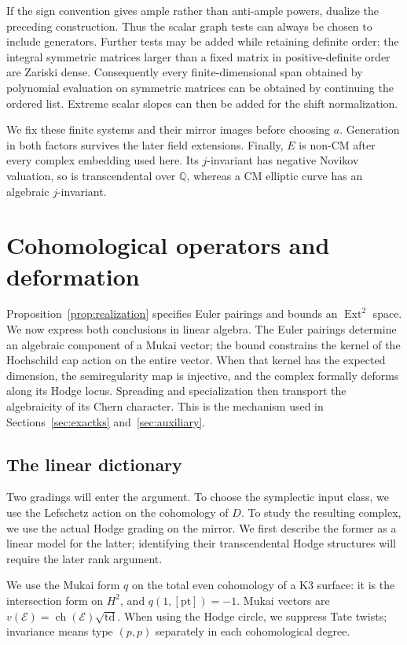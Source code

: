 \documentclass[11pt]{article}
\numberwithin{equation}{section}
\theoremstyle{definition}
\theoremstyle{remark}
\begin{document}
If the sign convention gives ample rather than anti-ample powers,
dualize the preceding construction.  Thus the scalar graph tests can
always be chosen to include generators.  Further tests may be added
while retaining definite order: the integral symmetric matrices larger
than a fixed matrix in positive-definite order are Zariski dense.
Consequently every finite-dimensional span obtained by polynomial
evaluation on symmetric matrices can be obtained by continuing the
ordered list.  Extreme scalar slopes can then be added for the shift
normalization.

We fix these finite systems and their mirror images before choosing
$a$.  Generation in both factors survives the later field extensions.
Finally, $E$ is non-CM after every complex embedding used here.  Its
$j$-invariant has negative Novikov valuation, so is transcendental over
$\mathbb Q$, whereas a CM elliptic curve has an algebraic $j$-invariant.

\section{Cohomological operators and deformation}\label{sec:cohomology}

Proposition~\ref{prop:realization} specifies Euler pairings and bounds an
\(\operatorname{Ext}^2\) space.  We now express both conclusions in linear algebra.
The Euler pairings determine an algebraic component of a Mukai vector;
the bound constrains the kernel of the Hochschild cap action on the
entire vector.  When that kernel has the expected dimension, the
semiregularity map is injective, and the complex formally deforms along
its Hodge locus.  Spreading and specialization then transport the
algebraicity of its Chern character.  This is the mechanism used in
Sections~\ref{sec:exactks} and~\ref{sec:auxiliary}.

\subsection{The linear dictionary}

Two gradings will enter the argument.  To choose the symplectic input
class, we use the Lefschetz action on the cohomology of \(D\).  To study
the resulting complex, we use the actual Hodge grading on the mirror.
We first describe the former as a linear model for the latter; identifying
their transcendental Hodge structures will require the later rank argument.

We use the Mukai form \(q\) on the total even cohomology of a K3
surface: it is the intersection form on \(H^2\), and
\(q(1,[\mathrm{pt}])=-1\).  Mukai vectors are
\(v(\mathcal E)=\operatorname{ch}(\mathcal E)\sqrt{\operatorname{td}}\).
When using the Hodge circle, we suppress Tate twists; invariance means
type \((p,p)\) separately in each cohomological degree.
\end{document}
